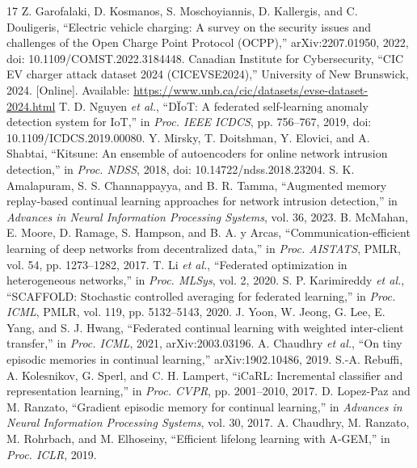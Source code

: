 \documentclass[journal,10pt]{IEEEtran}
\begin{document}
\begin{thebibliography}{17}
 Z. Garofalaki, D. Kosmanos, S. Moschoyiannis, D. Kallergis, and C. Douligeris, ``Electric vehicle charging: A survey on the security issues and challenges of the Open Charge Point Protocol (OCPP),'' arXiv:2207.01950, 2022, doi: 10.1109/COMST.2022.3184448.
 Canadian Institute for Cybersecurity, ``CIC EV charger attack dataset 2024 (CICEVSE2024),'' University of New Brunswick, 2024. [Online]. Available: \url{https://www.unb.ca/cic/datasets/evse-dataset-2024.html}
 T. D. Nguyen \emph{et al.}, ``D\"IoT: A federated self-learning anomaly detection system for IoT,'' in \emph{Proc. IEEE ICDCS}, pp. 756--767, 2019, doi: 10.1109/ICDCS.2019.00080.
 Y. Mirsky, T. Doitshman, Y. Elovici, and A. Shabtai, ``Kitsune: An ensemble of autoencoders for online network intrusion detection,'' in \emph{Proc. NDSS}, 2018, doi: 10.14722/ndss.2018.23204.
 S. K. Amalapuram, S. S. Channappayya, and B. R. Tamma, ``Augmented memory replay-based continual learning approaches for network intrusion detection,'' in \emph{Advances in Neural Information Processing Systems}, vol. 36, 2023.
 B. McMahan, E. Moore, D. Ramage, S. Hampson, and B. A. y Arcas, ``Communication-efficient learning of deep networks from decentralized data,'' in \emph{Proc. AISTATS}, PMLR, vol. 54, pp. 1273--1282, 2017.
 T. Li \emph{et al.}, ``Federated optimization in heterogeneous networks,'' in \emph{Proc. MLSys}, vol. 2, 2020.
 S. P. Karimireddy \emph{et al.}, ``SCAFFOLD: Stochastic controlled averaging for federated learning,'' in \emph{Proc. ICML}, PMLR, vol. 119, pp. 5132--5143, 2020.
 J. Yoon, W. Jeong, G. Lee, E. Yang, and S. J. Hwang, ``Federated continual learning with weighted inter-client transfer,'' in \emph{Proc. ICML}, 2021, arXiv:2003.03196.
 A. Chaudhry \emph{et al.}, ``On tiny episodic memories in continual learning,'' arXiv:1902.10486, 2019.
 S.-A. Rebuffi, A. Kolesnikov, G. Sperl, and C. H. Lampert, ``iCaRL: Incremental classifier and representation learning,'' in \emph{Proc. CVPR}, pp. 2001--2010, 2017.
 D. Lopez-Paz and M. Ranzato, ``Gradient episodic memory for continual learning,'' in \emph{Advances in Neural Information Processing Systems}, vol. 30, 2017.
 A. Chaudhry, M. Ranzato, M. Rohrbach, and M. Elhoseiny, ``Efficient lifelong learning with A-GEM,'' in \emph{Proc. ICLR}, 2019.


\end{thebibliography}
\end{document}
